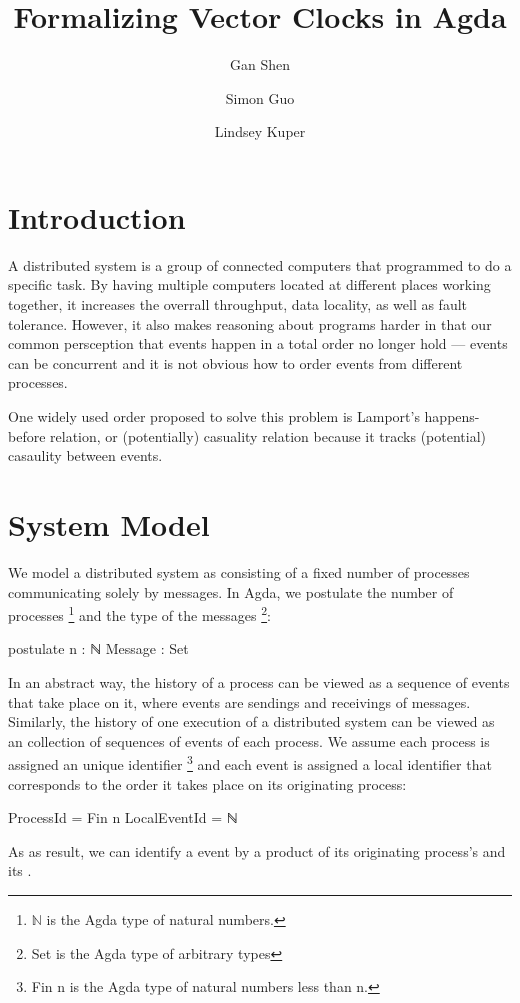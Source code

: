 \documentclass[acmsmall,review,anonymous]{acmart}
\title{Formalizing Vector Clocks in Agda}
\author{Gan Shen}
\affiliation{\institution{University of California, Santa Cruz} \country{USA}}
\author{Simon Guo}
\affiliation{\institution{University of California, Santa Cruz} \country{USA}}
\author{Lindsey Kuper}
\affiliation{\institution{University of California, Santa Cruz} \country{USA}}
\theoremstyle{definition}
\theoremstyle{theorem}
\begin{document}
\maketitle

\section{Introduction}
A distributed system is a group of connected computers that programmed
to do a specific task. By having multiple computers located at
different places working together, it increases the overrall
throughput, data locality, as well as fault tolerance. However, it
also makes reasoning about programs harder in that our common
persception that events happen in a total order no longer hold ---
events can be concurrent and it is not obvious how to order events
from different processes.

One widely used order proposed to solve this problem is Lamport's
happens-before relation, or (potentially) casuality relation because
it tracks (potential) casaulity between events.

\section{System Model}
We model a distributed system as consisting of a fixed number of
processes communicating solely by messages. In Agda, we postulate the
number of processes \footnote{\ensuremath{\mathbb{N}} is
the Agda type of natural numbers.} and the type of the messages
\footnote{Set is the Agda type of arbitrary types}:
\begin{code}
postulate
  n : ℕ
  Message : Set
\end{code}
In an abstract way, the history of a process can be viewed as a
sequence of events that take place on it, where events are sendings
and receivings of messages. Similarly, the history of one execution of
a distributed system can be viewed as an collection of sequences of
events of each process. We assume each process is assigned an unique
identifier \footnote{Fin n is the Agda type of
natural numbers less than n.} and each event is assigned a local
identifier  that corresponds to the order it
takes place on its originating process:
\begin{code}
ProcessId = Fin n
LocalEventId = ℕ
\end{code}
\noindent As as result, we can identify
a event by a product of its originating process's 
and its .
\end{document}
